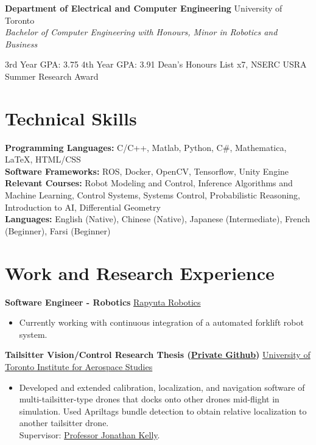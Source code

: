 \documentclass[10pt, a4paper]{cv}
\begin{document}
\textbf{Department of Electrical and Computer Engineering} \hfill University of Toronto\\
\emph{Bachelor of Computer Engineering with Honours, Minor in Robotics and Business}\\
\small{
	3rd Year GPA: 3.75\hspace{1em}
	4th Year GPA: 3.91\hspace{1em}
\small Dean's Honours List x7, NSERC USRA Summer Research Award

\section*{Technical Skills}
\textbf{Programming Languages:} C/C++, Matlab, Python, C\#, Mathematica, \LaTeX, HTML/CSS\\[0.2em]
\textbf{Software Frameworks:} ROS, Docker, OpenCV, Tensorflow, Unity Engine\\[0.2em]
\textbf{Relevant Courses:} Robot Modeling and Control, Inference Algorithms and Machine Learning, Control Systems, Systems Control, Probabilistic Reasoning, Introduction to AI, Differential Geometry \\
\textbf{Languages:} English (Native), Chinese (Native), Japanese (Intermediate), French (Beginner), Farsi (Beginner)
\section*{Work and Research Experience}\noindent
	\textbf{Software Engineer - Robotics} \hfill 	\href{https://www.rapyuta-robotics.com}{Rapyuta Robotics}
	\begin{itemize}
	\item Currently working with continuous integration of a automated forklift robot system.
	\end{itemize}

	\textbf{Tailsitter Vision/Control Research Thesis (\href{https://github.com/utiasSTARS/PhoenixDrone}{Private Github})} \hfill \href{http://www.starslab.ca}{University of Toronto Institute for Aerospace Studies}
	\begin{itemize}
	\item Developed and extended calibration, localization, and navigation software of multi-tailsitter-type drones that docks onto other drones mid-flight in simulation. Used Apriltags bundle detection to obtain relative localization to another tailsitter drone. \\Supervisor: \href{http://stars.utias.utoronto.ca/~jkelly/}{Professor Jonathan Kelly}.
	\end{itemize}

}
\end{document}
